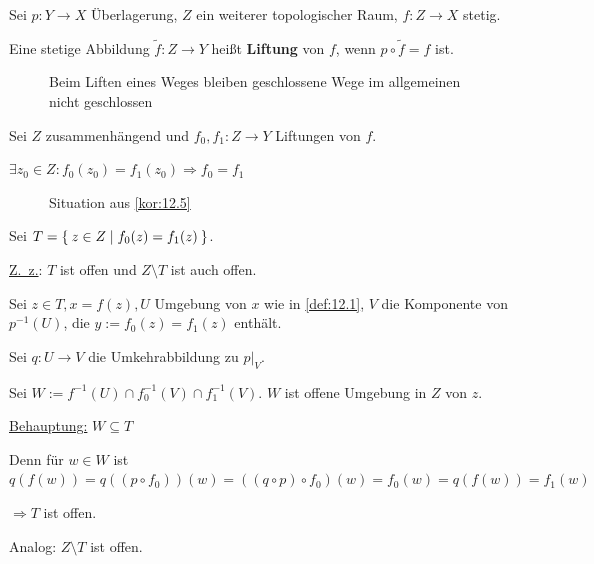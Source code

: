 \begin{definition}%
    Sei $p: Y \rightarrow X$ Überlagerung, $Z$ ein weiterer topologischer
    Raum, $f:Z \rightarrow X$ stetig.

    Eine stetige Abbildung $\tilde{f}: Z \rightarrow Y$ heißt
    \textbf{Liftung} von $f$, wenn $p \circ \tilde{f} = f$ ist.
\end{definition}

\begin{figure}[htp]
    \centering
    \resizebox{0.95\linewidth}{!}{}
    \caption{Beim Liften eines Weges bleiben geschlossene Wege im allgemeinen nicht geschlossen}
    \label{fig:satz-seifert-van-kampen}
\end{figure}

\begin{bemerkung}\label{kor:12.5}%
    Sei $Z$ zusammenhängend und $f_0, f_1: Z \rightarrow Y$
    Liftungen von $f$.

    $\exists z_0 \in Z: f_0(z_0) = f_1(z_0) \Rightarrow f_0 = f_1$
\end{bemerkung}

\begin{figure}[htp]
    \centering
    
    \caption{Situation aus \cref{kor:12.5}}
    \label{fig:situation-kor-12.5}
\end{figure}

\begin{beweis}
    Sei $T = \Set{z \in Z | f_0(z) = f_1(z)}$.

    \underline{Z.~z.}: $T$ ist offen und $Z \setminus T$ ist auch offen.

    Sei $z \in T, x = f(z), U$ Umgebung von $x$ wie in \cref{def:12.1},
    $V$ die Komponente von $p^{-1}(U)$, die $y:=f_0(z) = f_1(z)$
    enthält.

    Sei $q:U \rightarrow V$ die Umkehrabbildung zu $p|_V$.

    Sei $W:= f^{-1}(U) \cap f_0^{-1}(V) \cap f_1^{-1}(V)$. $W$ ist 
    offene Umgebung in $Z$ von $z$.

    \underline{Behauptung:} $W \subseteq T$

    Denn für $w \in W$ ist $q(f(w)) = q((p \circ f_0))(w) = ((q \circ p) \circ f_0) (w) = f_0(w) = q(f(w)) = f_1(w)$

    $\Rightarrow T$ ist offen.

    Analog: $Z \setminus T$ ist offen.
\end{beweis}

